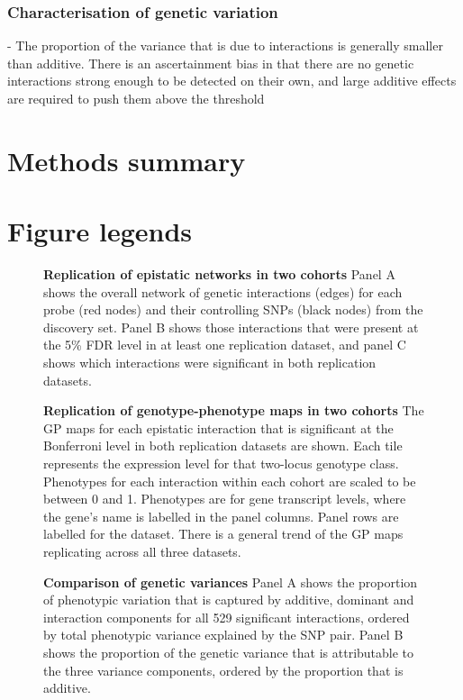 \documentclass{article}
\begin{document}
\subsubsection{Characterisation of genetic variation}
- The proportion of the variance that is due to interactions is generally smaller than additive. There is an ascertainment bias in that there are no genetic interactions strong enough to be detected on their own, and large additive effects are required to push them above the threshold






\clearpage
\section{Methods summary}




\clearpage
\section{Figure legends}

\begin{figure}[H]
	\caption{\textbf{Replication of epistatic networks in two cohorts} Panel A shows the overall network of genetic interactions (edges) for each probe (red nodes) and their controlling SNPs (black nodes) from the discovery set. Panel B shows those interactions that were present at the 5\% FDR level in at least one replication dataset, and panel C shows which interactions were significant in both replication datasets.}
	\label{fig:fireworks}
\end{figure}

\begin{figure}[H]
	\caption{\textbf{Replication of genotype-phenotype maps in two cohorts} The GP maps for each epistatic interaction that is significant at the Bonferroni level in both replication datasets are shown. Each tile represents the expression level for that two-locus genotype class. Phenotypes for each interaction within each cohort are scaled to be between 0 and 1. Phenotypes are for gene transcript levels, where the gene's name is labelled in the panel columns. Panel rows are labelled for the dataset. There is a general trend of the GP maps replicating across all three datasets.}
	\label{fig:gpmaps}
\end{figure}

\begin{figure}[H]
	\caption{\textbf{Comparison of genetic variances} Panel A shows the proportion of phenotypic variation that is captured by additive, dominant and interaction components for all 529 significant interactions, ordered by total phenotypic variance explained by the SNP pair. Panel B shows the proportion of the genetic variance that is attributable to the three variance components, ordered by the proportion that is additive.}
	\label{fig:variancecomponents}
\end{figure}
\end{document}
